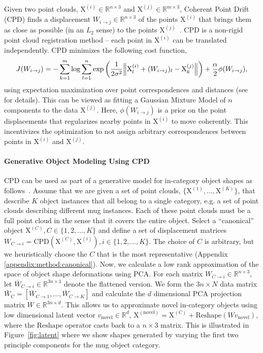 \documentclass{article}
\newcommand{\pcx}[1]{\mathrm{X}^{(#1)}}
\newcommand{\wxy}[2]{W_{#1 \rightarrow #2}}
\newcommand{\bwxy}[2]{\bar{W}_{#1 \rightarrow #2}}
\newcommand{\pci}{\pcx{i}}
\newcommand{\pcj}{\pcx{j}}
\newcommand{\pcc}{\pcx{C}}
\newcommand{\wij}{\wxy{i}{j}}
\begin{document}
Given two point clouds, $\pci \in \mathbb{R}^{n \times 3}$ and $\pcj \in \mathbb{R}^{m \times 3}$, Coherent Point Drift (CPD) finds a displacement $\wij  \in \mathbb{R}^{n \times 3}$ of the points $\pci$ that brings them as close as possible (in an $L_2$ sense) to the points $\pcj$~\cite{myronenko2010point}. CPD is a non-rigid point cloud registration method -- each point in $\pci$ can be translated independently. CPD minimizes the following cost function,
\begin{align}
    J(\wij) = - \sum_{k=1}^{m} \log \sum_{l=1}^{n} \exp \left( \frac{1}{2 \sigma^2} \norm{\pci_l + (W_{i \rightarrow j})_l - \pcj_k } \right) + \frac{\alpha}{2} \phi(\wij),
\end{align}
using expectation maximization over point correspondences and distances (see~\cite{myronenko2010point} for details). This can be viewed as fitting a Gaussian Mixture Model of $n$ components to the data $\pcj$. Here, $\phi(\wij)$ is a prior on the point displacements that regularizes nearby points in $\pci$ to move coherently. This incentivizes the optimization to not assign arbitrary correspondences between points in $\pci$ and $\pcj$.

\paragraph{Generative Object Modeling Using CPD}

CPD can be used as part of a generative model for in-category object shapes as follows~\cite{rodriguez18transferring}. Assume that we are given a set of point clouds, $\{\pcx{1}, \dots, \pcx{K}\}$, that describe $K$ object instances that all belong to a single category, e.g. a set of point clouds describing different mug instances. Each of these point clouds must be a full point cloud in the sense that it covers the entire object. Select a ``canonical'' object $\pcx{C}, C \in \{1,2, ..., K\}$ and define a set of displacement matrices $\wxy{C}{i} = \mathrm{CPD}(\pcx{C}, \pcx{i}), i \in \{1, 2, ..., K\}$. The choice of $C$ is arbitrary, but we heuristically choose the $C$ that is the most representative (Appendix \ref{appendix:method:canonical}). Now, we calculate a low rank approximation of the space of object shape deformations using PCA. For each matrix $\wxy{C}{i} \in \mathbb{R}^{n \times 3}$, let $\bwxy{C}{i} \in \mathbb{R}^{3n \times 1}$ denote the flattened version. We form the $3n \times N$ data matrix $\bar{W}_C = \left[\bwxy{C}{1}, \dots, \bwxy{C}{K}\right]$ and calculate the $d$ dimensional PCA projection matrix $W \in \mathbb{R}^{3n \times d}$. This allows us to approximate novel in-category objects using low dimensional latent vector $v_{\mathrm{novel}} \in \mathbb{R}^d$, $\pcx{\mathrm{novel}} = \pcc + \mathrm{Reshape}(W v_{\mathrm{novel}})$, where the $\mathrm{Reshape}$ operator casts back to a $n \times 3$ matrix. This is illustrated in Figure~\ref{fig:latent} where we show shapes generated by varying the first two principle components for the mug object category.
\end{document}
